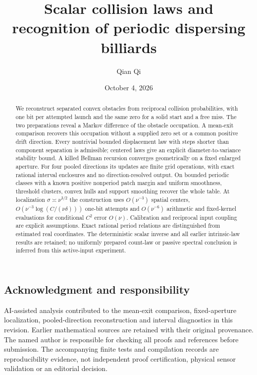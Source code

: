 \documentclass[11pt]{amsart}
\title[Scalar collision laws]{Scalar collision laws and recognition of periodic dispersing billiards}
\author{Qian Qi}\date{October 4, 2026}
\theoremstyle{definition}\newtheorem{definition}[theorem]{Definition}
\theoremstyle{remark}\newtheorem{remark}[theorem]{Remark}
\numberwithin{equation}{section}
\begin{document}
\raggedbottom
\begin{abstract}
We reconstruct separated convex obstacles from reciprocal collision
probabilities, with one bit per attempted launch and the same zero
for a solid start and a free miss. The two preparations reveal a
Markov difference of the obstacle occupation. A mean-exit comparison
recovers this occupation without a supplied zero set or a common
positive drift direction. Every nontrivial bounded displacement law
with steps shorter than component separation is admissible; centered
laws give an explicit diameter-to-variance stability bound. A killed
Bellman recursion converges geometrically on a fixed enlarged aperture.
For four pooled directions its updates are finite grid operations,
with exact rational interval enclosures and no direction-resolved
output. On bounded periodic classes with a known positive nonperiod
patch margin and uniform smoothness, threshold clusters, convex hulls
and support smoothing recover the whole table. At localization
$\sigma\asymp\nu^{3/2}$ the construction uses $O(\nu^{-3})$
spatial centers, $O(\nu^{-3}\log(C/(\nu\delta)))$ one-bit attempts
and $O(\nu^{-6})$ arithmetic and fixed-kernel evaluations for
conditional $C^2$ error $O(\nu)$. Calibration and reciprocal input
coupling are explicit assumptions. Exact rational period relations
are distinguished from estimated real coordinates. The deterministic
scalar inverse and all earlier intrinsic-law results are retained;
no uniformly prepared count-law or passive spectral conclusion is
inferred from this active-input experiment.
\end{abstract}\maketitle












\subsection*{Acknowledgment and responsibility}
AI-assisted analysis contributed to the mean-exit comparison, fixed-aperture
localization, pooled-direction reconstruction and interval diagnostics
in this revision.
Earlier mathematical sources are retained with their original provenance.
The named author is responsible for checking all proofs and references
before submission. The accompanying finite tests and compilation records
are reproducibility evidence, not independent proof certification,
physical sensor validation or an editorial decision.
\clearpage

\end{document}
